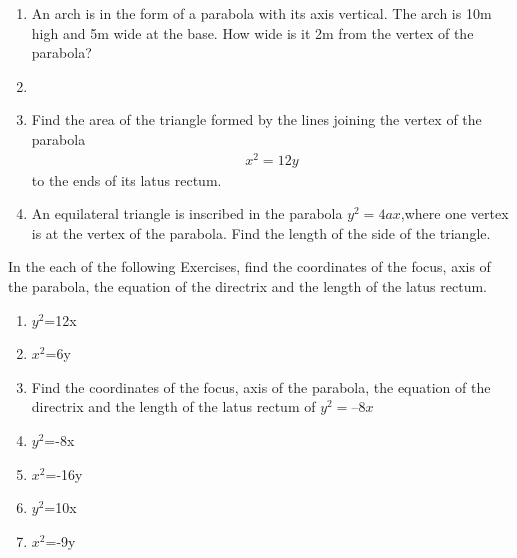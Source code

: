 
\begin{enumerate}[label=\thesection.\arabic*,ref=\thesection.\theenumi]
\item An arch is in the form of a parabola with its axis vertical. The arch is 10m high and 5m wide at the base. How wide is it 2m from the vertex of the parabola?
\label{chapters/11/11/5/2}

\item 
    \item Find the area of the triangle formed by the lines joining the vertex 
    of the parabola 
    \begin{align}
        x^2 = 12y
        \label{eq:chapters/11/11/5/6/parabola}
    \end{align}
    to the ends of its latus rectum.
\label{chapters/11/11/5/6}

\item An equilateral triangle is inscribed in the parabola $y^{2} = 4ax$,where one vertex is at the vertex of the parabola. Find the length of the side of the triangle.
\label{chapters/11/11/5/8}

\end{enumerate}
In the each of the following Exercises, find the coordinates of the focus, axis of the parabola, the equation of the directrix and the length of the latus rectum.
\begin{enumerate}[label=\thesection.\arabic*,ref=\thesection.\theenumi,resume*]

\item $y^2$=12x 
\label{chapters/11/11/2/1}
\\
\solution



\item $x^2$=6y 
\\
\solution

\item Find the coordinates of the focus, axis of the
parabola, the equation of the directrix and the length of the latus rectum of $y^2 = –8x$
\\
\solution

\item $y^2$=-8x

\item $x^2$=-16y
\\
\solution


\item $y^2$=10x  

\item $x^2$=-9y  
\end{enumerate}

